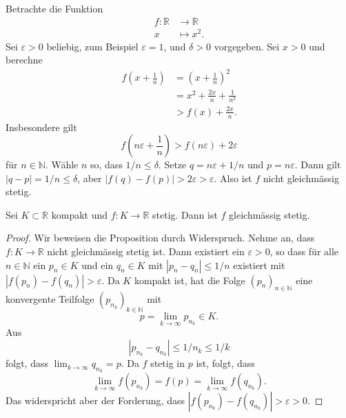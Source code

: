 \documentclass[../main.tex]{subfiles}
\begin{document}
\begin{example}
  Betrachte die Funktion
  \begin{align*}
    f \colon \mathbb{R} & \to \mathbb{R} \\
    x & \mapsto x^2.
  \end{align*}
  Sei $\varepsilon > 0$ beliebig,
  zum Beispiel $\varepsilon = 1$, und $\delta > 0$ vorgegeben.  
  Sei $x > 0$ und berechne
  \begin{align*}
    f\left(x + \frac{1}{n}\right) 
    & = {\left(x + \frac{1}{n}\right)}^2 \\
               & = x^2 + \frac{2x}{n} + \frac{1}{n^2} \\
               & > f(x) + \frac{2x}{n}.
  \end{align*}
  Insbesondere gilt
  \[
  f\left(n \varepsilon + \frac{1}{n}\right)
  > f(n \varepsilon) + 2 \varepsilon
  \]
  für $n \in \mathbb{N}$. Wähle
  $n$ so, dass $1/n \leq \delta$.
  Setze $q = n\varepsilon + 1/n$ 
  und $p = n\varepsilon$.
  Dann gilt $|q - p| = 1/n \leq \delta$,
  aber
  $|f(q) - f(p)| > 2 \varepsilon > \varepsilon$.
  Also ist $f$ nicht gleichmässig stetig.
\end{example}

\begin{proposition}
  Sei $K \subset \mathbb{R}$ kompakt
  und $f \colon K \to \mathbb{R}$ stetig.
  Dann ist $f$ gleichmässig stetig.
\end{proposition}

\begin{proof}
  Wir beweisen die Proposition durch Widerspruch.
  Nehme an, dass $f \colon K \to \mathbb{R}$ nicht
  gleichmässig stetig ist.
  Dann existiert ein $\varepsilon > 0$,
  so dass für alle $n \in \mathbb{N}$ 
  ein $p_n \in K$ und ein $q_n \in K$ mit
  $|p_n - q_n| \leq 1/n$ existiert
  mit $
    |f(p_n) - f(q_n)| > \varepsilon$.
  Da $K$ kompakt ist,
  hat die Folge ${(p_{n})}_{n \in \mathbb{N}}$ 
  eine konvergente Teilfolge
  ${(p_{n_k})}_{k \in \mathbb{N}}$ 
  mit
  \[
    p = \lim_{k \to \infty}p_{n_k} \in K.
  \]
  Aus
  \[
    |p_{n_k} - q_{n_k}| \leq 1/n_k \leq 1/k
  \]
  folgt, dass
  $
    \lim_{k \to \infty} q_{n_k} = p
    $.
  Da $f$ stetig in $p$ ist, folgt, dass
  \[
    \lim_{k \to \infty} f(p_{n_k}) 
    = f(p) 
    = \lim_{k \to \infty} f(q_{n_k}).
  \]
  Das widerspricht aber der Forderung,
  dass $|f(p_{n_k}) - f(q_{n_k})| > \varepsilon > 0$.
\end{proof}
\end{document}
